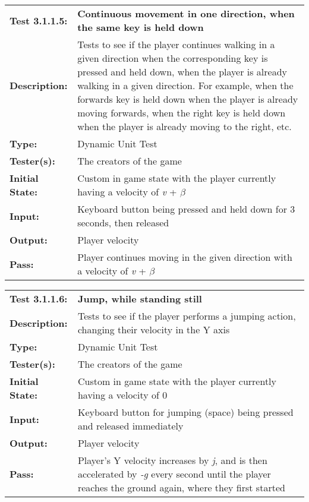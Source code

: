\documentclass[12pt, titlepage]{article}
\begin{document}
\begin{enumerate}
\begin{mdframed}[linewidth=1pt]
\begin{tabularx}{\textwidth}{@{}p{3cm}X@{}}
{\bf Test 3.1.1.5:} & {\bf Continuous movement in one direction, when the same key is held down}\\[\baselineskip]
{\bf Description:} & Tests to see if the player continues walking in a given direction when the corresponding key is pressed and held down, when the player is already walking in a given direction. For example, when the forwards key is held down when the player is already moving forwards, when the right key is held down when the player is already moving to the right, etc.\\[0.5\baselineskip]
{\bf Type:} & Dynamic Unit Test\\[0.5\baselineskip]
{\bf Tester(s):} & The creators of the game\\[0.5\baselineskip]
{\bf Initial State:} & Custom in game state with the player currently having a velocity of \textit{v} + $\beta$ \\[0.5\baselineskip]
{\bf Input:} & Keyboard button being pressed and held down for 3 seconds, then released\\[0.5\baselineskip]
{\bf Output:} & Player velocity\\[0.5\baselineskip]
{\bf Pass:} & Player continues moving in the given direction with a velocity of \textit{v} + $\beta$
\end{tabularx}
\end{mdframed}


\begin{mdframed}[linewidth=1pt]
\begin{tabularx}{\textwidth}{@{}p{3cm}X@{}}
{\bf Test 3.1.1.6:} & {\bf Jump, while standing still}\\[\baselineskip]
{\bf Description:} & Tests to see if the player performs a jumping action, changing their velocity in the Y axis\\[0.5\baselineskip]
{\bf Type:} & Dynamic Unit Test\\[0.5\baselineskip]
{\bf Tester(s):} & The creators of the game\\[0.5\baselineskip]
{\bf Initial State:} & Custom in game state with the player currently having a velocity of 0\\[0.5\baselineskip]
{\bf Input:} & Keyboard button for jumping (space) being pressed and released immediately\\[0.5\baselineskip]
{\bf Output:} & Player velocity\\[0.5\baselineskip]
{\bf Pass:} & Player's Y velocity increases by \textit{j}, and is then accelerated by \textit{-g} every second until the player reaches the ground again, where they first started
\end{tabularx}
\end{mdframed}


\end{enumerate}
\end{document}
